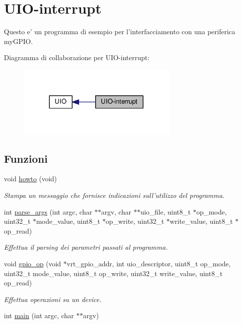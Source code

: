 \hypertarget{group___u_i_o-interrupt}{\section{U\+I\+O-\/interrupt}
\label{group___u_i_o-interrupt}
}


Questo e' un programma di esempio per l'interfacciamento con una periferica my\+G\+P\+I\+O.  


Diagramma di collaborazione per U\+I\+O-\/interrupt\+:\nopagebreak
\begin{figure}[H]
\begin{center}
\leavevmode
\includegraphics[width=224pt]{group___u_i_o-interrupt}
\end{center}
\end{figure}
\subsection*{Funzioni}
\begin{DoxyCompactItemize}
\item 
void \hyperlink{group___u_i_o-interrupt_ga05909651fa170a63e98e3f8e13451b7b}{howto} (void)
\begin{DoxyCompactList}\small\item\em Stampa un messaggio che fornisce indicazioni sull'utilizzo del programma. \end{DoxyCompactList}\item 
int \hyperlink{group___u_i_o-interrupt_ga15f7e5adb83963e5d21ccea3186b5364}{parse\+\_\+args} (int argc, char $\ast$$\ast$argv, char $\ast$$\ast$uio\+\_\+file, uint8\+\_\+t $\ast$op\+\_\+mode, uint32\+\_\+t $\ast$mode\+\_\+value, uint8\+\_\+t $\ast$op\+\_\+write, uint32\+\_\+t $\ast$write\+\_\+value, uint8\+\_\+t $\ast$op\+\_\+read)
\begin{DoxyCompactList}\small\item\em Effettua il parsing dei parametri passati al programma. \end{DoxyCompactList}\item 
void \hyperlink{group___u_i_o-interrupt_ga78b676750c5d08c316cad35ec3963c53}{gpio\+\_\+op} (void $\ast$vrt\+\_\+gpio\+\_\+addr, int uio\+\_\+descriptor, uint8\+\_\+t op\+\_\+mode, uint32\+\_\+t mode\+\_\+value, uint8\+\_\+t op\+\_\+write, uint32\+\_\+t write\+\_\+value, uint8\+\_\+t op\+\_\+read)
\begin{DoxyCompactList}\small\item\em Effettua operazioni su un device. \end{DoxyCompactList}\item 
int \hyperlink{group___u_i_o-interrupt_ga3c04138a5bfe5d72780bb7e82a18e627}{main} (int argc, char $\ast$$\ast$argv)
\end{DoxyCompactItemize}


